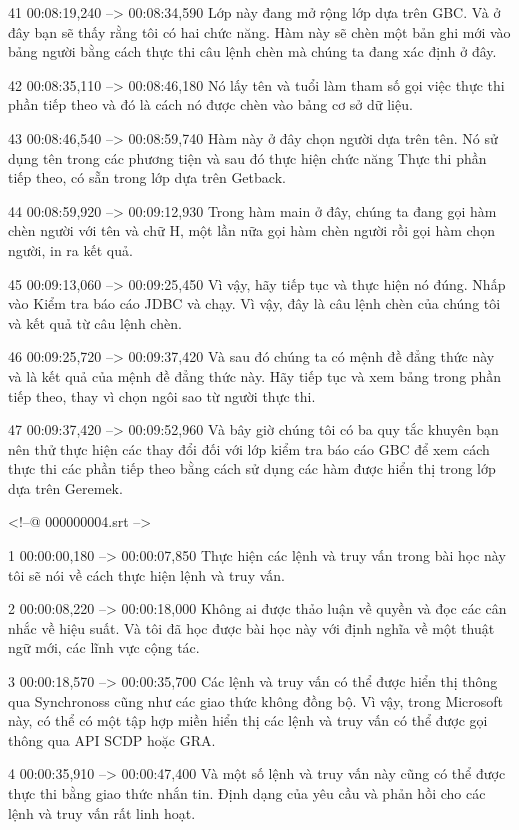 41
00:08:19,240 --> 00:08:34,590
Lớp này đang mở rộng lớp dựa trên GBC.  Và ở đây bạn sẽ thấy rằng tôi có hai chức năng.  Hàm này sẽ chèn một bản ghi mới vào bảng người bằng cách thực thi câu lệnh chèn mà chúng ta đang xác định ở đây.

42
00:08:35,110 --> 00:08:46,180
Nó lấy tên và tuổi làm tham số gọi việc thực thi phần tiếp theo và đó là cách nó được chèn vào bảng cơ sở dữ liệu.

43
00:08:46,540 --> 00:08:59,740
Hàm này ở đây chọn người dựa trên tên.  Nó sử dụng tên trong các phương tiện và sau đó thực hiện chức năng Thực thi phần tiếp theo, có sẵn trong lớp dựa trên Getback.

44
00:08:59,920 --> 00:09:12,930
Trong hàm main ở đây, chúng ta đang gọi hàm chèn người với tên và chữ H, một lần nữa gọi hàm chèn người rồi gọi hàm chọn người, in ra kết quả.

45
00:09:13,060 --> 00:09:25,450
Vì vậy, hãy tiếp tục và thực hiện nó đúng.  Nhấp vào Kiểm tra báo cáo JDBC và chạy.  Vì vậy, đây là câu lệnh chèn của chúng tôi và kết quả từ câu lệnh chèn.

46
00:09:25,720 --> 00:09:37,420
Và sau đó chúng ta có mệnh đề đẳng thức này và là kết quả của mệnh đề đẳng thức này.  Hãy tiếp tục và xem bảng trong phần tiếp theo, thay vì chọn ngôi sao từ người thực thi.

47
00:09:37,420 --> 00:09:52,960
Và bây giờ chúng tôi có ba quy tắc khuyên bạn nên thử thực hiện các thay đổi đối với lớp kiểm tra báo cáo GBC để xem cách thực thi các phần tiếp theo bằng cách sử dụng các hàm được hiển thị trong lớp dựa trên Geremek.

<!--@ 000000004.srt -->

1
00:00:00,180 --> 00:00:07,850
Thực hiện các lệnh và truy vấn trong bài học này tôi sẽ nói về cách thực hiện lệnh và truy vấn.

2
00:00:08,220 --> 00:00:18,000
Không ai được thảo luận về quyền và đọc các cân nhắc về hiệu suất.  Và tôi đã học được bài học này với định nghĩa về một thuật ngữ mới, các lĩnh vực cộng tác.

3
00:00:18,570 --> 00:00:35,700
Các lệnh và truy vấn có thể được hiển thị thông qua Synchronoss cũng như các giao thức không đồng bộ.  Vì vậy, trong Microsoft này, có thể có một tập hợp miền hiển thị các lệnh và truy vấn có thể được gọi thông qua API SCDP hoặc GRA.

4
00:00:35,910 --> 00:00:47,400
Và một số lệnh và truy vấn này cũng có thể được thực thi bằng giao thức nhắn tin.  Định dạng của yêu cầu và phản hồi cho các lệnh và truy vấn rất linh hoạt.

